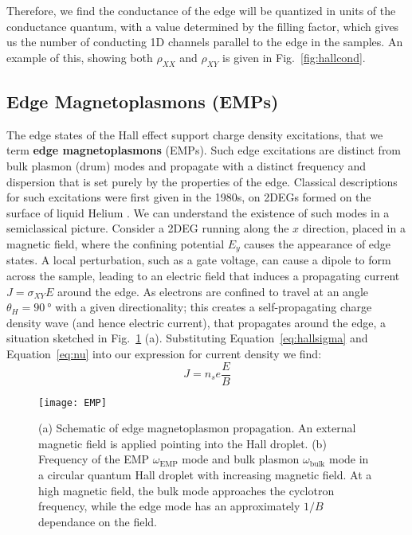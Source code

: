 Therefore, we find the conductance of the edge will be quantized in units of the conductance quantum, with a value determined
by the filling factor, which gives us the number of conducting 1D channels parallel to the edge in the samples. An example of this, showing both $\rho_{XX}$
and $\rho_{XY}$ is given in Fig.~\ref{fig:hallcond}.

\subsection{Edge Magnetoplasmons (EMPs)}
The edge states of the Hall effect support charge density excitations, that we term \textbf{edge magnetoplasmons} (EMPs).
Such edge excitations are distinct from bulk plasmon (drum) modes and propagate with
a distinct frequency and dispersion that is set purely by the properties of the edge. Classical descriptions for such excitations
were first given in the 1980s, on 2DEGs formed on the surface of liquid Helium \cite{PhysRevLett.54.1706,PhysRevB.32.7676,1985ZhPmR..42..450V}.
We can understand the existence of such modes in a semiclassical picture. Consider a 2DEG running along the $x$ direction, placed in a magnetic field,
where the confining potential $E_y$ causes the appearance of edge states. A local perturbation, such as a gate voltage, can cause a dipole to form across
the sample, leading to an electric field that induces a propagating current $J = \sigma_{XY}E$ around the edge. As electrons are confined to travel at an
angle $\theta_H = \SI{90}{\degree}$ with a given directionality; this creates a self-propagating charge density wave (and hence electric current), that propagates
around the edge, a situation sketched in Fig.~\ref{fig:EMP} (a). Substituting Equation~\ref{eq:hallsigma} and Equation~\ref{eq:nu} into our expression for current density we find:
\begin{equation}
  J = n_s e \frac{E}{B}
\end{equation}

\begin{figure}
  \texttt{[image: EMP]}
  \caption[Edge magnetoplasmons]
  {\label{fig:EMP}(a) Schematic of edge magnetoplasmon propagation. An external magnetic field is applied pointing into the Hall droplet.
  (b) Frequency of the EMP $\omega_\textrm{EMP}$ mode and bulk plasmon $\omega_\textrm{bulk}$ mode in a circular quantum Hall droplet with increasing magnetic field. At a high magnetic field, the bulk mode approaches the cyclotron frequency, while the edge mode has an approximately
  $1/B$ dependance on the field.}
\end{figure}

